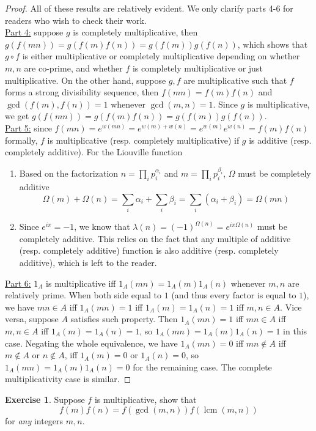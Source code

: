 \documentclass{article}
\theoremstyle{definition}
\newtheorem{exercise}[theorem]{Exercise}
\begin{document}
\begin{proof}
All of these results are relatively evident. We only clarify parts 4-6 for readers who wish to check their work.
\\
\underline{Part 4:} suppose $g$ is completely multiplicative, then $g(f(mn)) = g(f(m) f(n)) = g(f(m)) g(f(n))$, which shows that $g \circ f$ is either multiplicative or completely multiplicative depending on whether $m, n$ are co-prime, and whether $f$ is completely multiplicative or just multiplicative. On the other hand, suppose $g, f$ are multiplicative such that $f$ forms a strong divisibility sequence, then $f(mn) = f(m) f(n)$ and $\gcd(f(m), f(n)) = 1$ whenever $\gcd(m, n) = 1$. Since $g$ is multiplicative, we get $g(f(mn)) = g(f(m) f(n)) = g(f(m)) g(f(n))$.
\\
\underline{Part 5:} since $f(mn) = e^{w(mn)} = e^{w(m) + w(n)} = e^{w(m)} e^{w(n)} = f(m) f(n)$ formally, $f$ is multiplicative (resp. completely multiplicative) if $g$ is additive (resp. completely additive). For the Liouville function
\begin{enumerate}
	\item Based on the factorization $n = \prod_{i} p_i^{\alpha_i}$ and $m = \prod_i p_i^{\beta_i}$, $\Omega$ must be completely additive
	$$\Omega(m) + \Omega(n) = \sum_i \alpha_i + \sum_i \beta_i = \sum_i (\alpha_i + \beta_i) = \Omega(mn)$$
	\item Since $e^{i \pi} = -1$, we know that $\lambda(n) = (-1)^{\Omega(n)} = e^{i \pi \Omega(n)}$ must be completely additive. This relies on the fact that any multiple of additive (resp. completely additive) function is also additive (resp. completely additive), which is left to the reader.
\end{enumerate}
\underline{Part 6:} $1_A$ is multiplicative iff $1_A (mn) = 1_A (m) 1_A (n)$ whenever $m, n$ are relatively prime. When both side equal to $1$ (and thus every factor is equal to $1$), we have $mn \in A$ iff $1_A (mn) = 1$ iff $1_A (m) = 1_A (n) = 1$ iff $m, n \in A$. Vice versa, suppose $A$ satisfies such property. Then $1_A (mn) = 1$ iff $mn \in A$ iff $m, n \in A$ iff $1_A (m) = 1_A (n) = 1$, so $1_A (mn) = 1_A (m) 1_A (n) = 1$ in this case. Negating the whole equivalence, we have $1_A (mn) = 0$ iff $mn \notin A$ iff $m \notin A$ or $n \notin A$, iff $1_A (m) = 0$ or $1_A (n) = 0$, so $1_A (mn) = 1_A (m) 1_A (n) = 0$ for the remaining case. The complete multiplicativity case is similar.
\end{proof}
\begin{exercise}
Suppose $f$ is multiplicative, show that
$$f(m) f(n) = f(\gcd(m, n)) f(\operatorname{lcm} (m, n))$$ for \textit{any} integers $m, n$.
\end{exercise}
\end{document}
